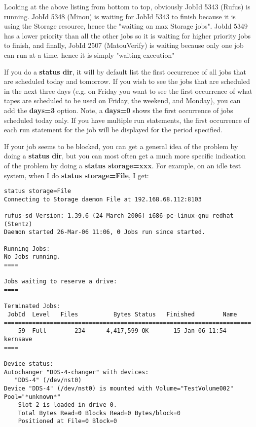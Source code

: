 \begin{description}
   Looking at the above listing from bottom to top, obviously JobId 5343
   (Rufus) is running.  JobId 5348 (Minou) is waiting for JobId 5343 to
   finish because it is using the Storage resource, hence the "waiting on
   max Storage jobs".  JobId 5349 has a lower priority than all the other
   jobs so it is waiting for higher priority jobs to finish, and finally,
   JobId 2507 (MatouVerify) is waiting because only one job can run at a
   time, hence it is simply "waiting execution"

   If you do a {\bf status dir}, it will by default list the first
   occurrence of all jobs that are scheduled today and tomorrow.  If you
   wish to see the jobs that are scheduled in the next three days (e.g.  on
   Friday you want to see the first occurrence of what tapes are scheduled
   to be used on Friday, the weekend, and Monday), you can add the {\bf
   days=3} option.  Note, a {\bf days=0} shows the first occurrence of jobs
   scheduled today only.  If you have multiple run statements, the first
   occurrence of each run statement for the job will be displayed for the
   period specified.

   If your job seems to be blocked, you can get a general idea of the
   problem by doing a {\bf status dir}, but you can most often get a
   much more specific indication of the problem by doing a
   {\bf status storage=xxx}.  For example, on an idle test system, when
   I do {\bf status storage=File}, I get:
\footnotesize
\begin{verbatim}
status storage=File
Connecting to Storage daemon File at 192.168.68.112:8103

rufus-sd Version: 1.39.6 (24 March 2006) i686-pc-linux-gnu redhat (Stentz)
Daemon started 26-Mar-06 11:06, 0 Jobs run since started.

Running Jobs:
No Jobs running.
====

Jobs waiting to reserve a drive:
====

Terminated Jobs:
 JobId  Level   Files          Bytes Status   Finished        Name
======================================================================
    59  Full        234      4,417,599 OK       15-Jan-06 11:54 kernsave
====

Device status:
Autochanger "DDS-4-changer" with devices:
   "DDS-4" (/dev/nst0)
Device "DDS-4" (/dev/nst0) is mounted with Volume="TestVolume002"
Pool="*unknown*"
    Slot 2 is loaded in drive 0.
    Total Bytes Read=0 Blocks Read=0 Bytes/block=0
    Positioned at File=0 Block=0


\end{verbatim}
\end{description}
